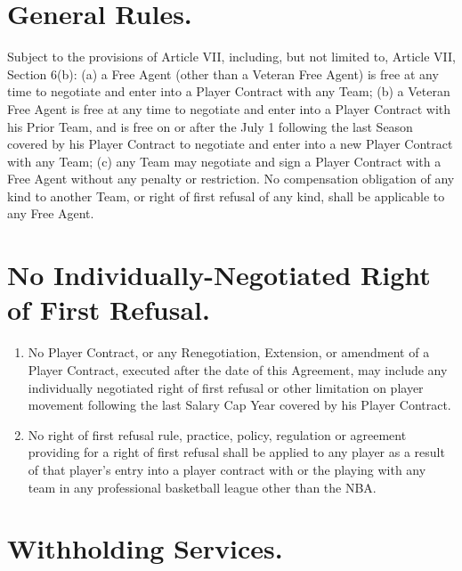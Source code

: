 \documentclass[
]{book}
\providecommand{\tightlist}{%
  \setlength{\itemsep}{0pt}\setlength{\parskip}{0pt}}
\begin{document}
\hypertarget{general-rules.}{%
\section{General Rules.}\label{general-rules.}}

Subject to the provisions of Article VII, including, but not limited to, Article VII, Section 6(b): (a) a Free Agent (other than a Veteran Free Agent) is free at any time to negotiate and enter into a Player Contract with any Team; (b) a Veteran Free Agent is free at any time to negotiate and enter into a Player Contract with his Prior Team, and is free on or after the July 1 following the last Season covered by his Player Contract to negotiate and enter into a new Player Contract with any Team; (c) any Team may negotiate and sign a Player Contract with a Free Agent without any penalty or restriction. No compensation obligation of any kind to another Team, or right of first refusal of any kind, shall be applicable to any Free Agent.

\hypertarget{no-individually-negotiated-right-of-first-refusal.}{%
\section{No Individually-Negotiated Right of First Refusal.}\label{no-individually-negotiated-right-of-first-refusal.}}

\begin{enumerate}
\def\labelenumi{(\alph{enumi})}
\tightlist
\item
  No Player Contract, or any Renegotiation, Extension, or amendment of a Player Contract, executed after the date of this Agreement, may include any individually negotiated right of first refusal or other limitation on player movement following the last Salary Cap Year covered by his Player Contract.
\item
  No right of first refusal rule, practice, policy, regulation or agreement providing for a right of first refusal shall be applied to any player as a result of that player's entry into a player contract with or the playing with any team in any professional basketball league other than the NBA.
\end{enumerate}

\hypertarget{withholding-services.}{%
\section{Withholding Services.}\label{withholding-services.}}
\end{document}
